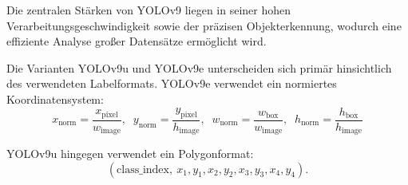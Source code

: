 Die zentralen Stärken von \acrshort{YOLO}v9 liegen in seiner hohen Verarbeitungsgeschwindigkeit sowie der präzisen Objekterkennung, wodurch eine effiziente Analyse großer Datensätze ermöglicht wird. 


Die Varianten \acrshort{YOLO}v9u und \acrshort{YOLO}v9e unterscheiden sich primär hinsichtlich des verwendeten Labelformats. \acrshort{YOLO}v9e verwendet ein normiertes Koordinatensystem:
\begin{equation}
x_\text{norm} = \frac{x_\text{pixel}}{w_\text{image}},\;\;
y_\text{norm} = \frac{y_\text{pixel}}{h_\text{image}},\;\;
w_\text{norm} = \frac{w_\text{box}}{w_\text{image}},\;\;
h_\text{norm} = \frac{h_\text{box}}{h_\text{image}}
\end{equation}

\acrshort{YOLO}v9u hingegen verwendet ein Polygonformat:
\begin{equation}
(\text{class\_index},\ x_1, y_1, x_2, y_2, x_3, y_3, x_4, y_4).
\end{equation}





